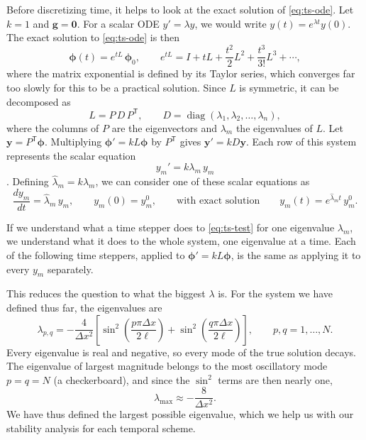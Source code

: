 Before discretizing time, it helps to look at the exact solution of
\eqref{eq:ts-ode}. Let $k=1$ and $\mathbf{g}=\mathbf{0}$. For a scalar
ODE $y' = \lambda y$, we would write $y(t) = e^{\lambda t}y(0)$. The exact solution to \eqref{eq:ts-ode} is then
\begin{equation}
  \boldsymbol{\phi}(t) = e^{tL}\,\boldsymbol{\phi}_0,
  \qquad
  e^{tL} = I + tL + \frac{t^2}{2}L^2 + \frac{t^3}{3!}L^3 + \cdots,
  \label{eq:ts-matexp}
\end{equation}
where the matrix exponential is defined by its Taylor series, which converges far too slowly for this to be a practical solution. Since $L$ is symmetric, it can be decomposed as
\begin{equation}
  L = P\,D\,P^{\mathsf T},
  \qquad D = \operatorname{diag}(\lambda_1,\lambda_2,\dots,\lambda_n),
  \label{eq:ts-diag}
\end{equation}
where the columns of $P$ are the eigenvectors and $\lambda_m$ the eigenvalues of $L$. Let $\mathbf{y} = P^{\mathsf T}\boldsymbol{\phi}$. Multiplying
$\boldsymbol{\phi}' = kL\boldsymbol{\phi}$ by $P^{\mathsf T}$ gives
$\mathbf{y}' = kD\mathbf{y}$. Each row of this system represents the scalar equation
$$y_m' = k\lambda_m\,y_m$$. 
Defining $\hat{\lambda}_m = k \lambda_m$, we can consider one of these scalar equations as
\begin{equation}
  \frac{dy_m}{dt} = \hat{\lambda}_m\,y_m, \qquad y_m(0) = y_m^0,
  \qquad\text{with exact solution}\qquad y_m(t) = e^{\hat{\lambda}_m t}\,y_m^0.
  \label{eq:ts-test}
\end{equation}

\begin{remark}
If we understand what a time stepper does to \eqref{eq:ts-test} for one
eigenvalue $\lambda_m$, we understand what it does to the whole system, one
eigenvalue at a time. Each of the following time steppers, applied to
$\boldsymbol{\phi}' = kL\boldsymbol{\phi}$, is the same as applying it to every $y_m$
separately.
\end{remark}

This reduces the question to what the biggest $\lambda$ is. For the system we have defined thus far, the eigenvalues are
\begin{equation}
  \lambda_{p,q} = -\frac{4}{\Delta x^2}\left[
  \sin^2\!\left(\frac{p\pi\Delta x}{2\ell}\right) +
  \sin^2\!\left(\frac{q\pi\Delta x}{2\ell}\right)\right],
  \qquad p,q = 1,\dots,N.
  \label{eq:ts-eigs}
\end{equation}
Every eigenvalue is real and negative, so every mode of the true solution decays.
The eigenvalue of largest magnitude belongs to the most oscillatory mode
$p = q = N$ (a checkerboard), and since the $\sin^2$ terms are then nearly one,
\begin{equation}
  \lambda_{\max} \approx -\frac{8}{\Delta x^2}.
  \label{eq:ts-lammax}
\end{equation}
We have thus defined the largest possible eigenvalue, which we help us with our stability analysis for each temporal scheme.


